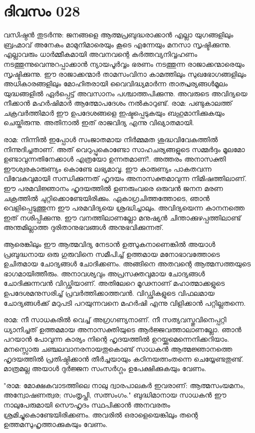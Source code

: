 \newpage
\section{ദിവസം 028}


വസിഷ്ഠന്‍ തുടര്‍ന്നു: ജനങ്ങളെ ആത്മപ്രബുദ്ധരാക്കാന്‍ എല്ലാ യുഗങ്ങളിലും ബ്രഹ്മാവ്‌ അനേകം മാമുനിമാരെയും കൂടെ എന്നേയും മനസാ സൃഷ്ടിക്കുന്നു. എല്ലാവരും ധാര്‍മ്മീകമായി അവനവന്റെ കര്‍ത്തവ്യനിവ്വഹണം നടത്തുന്നുവെന്നുറപ്പാക്കാന്‍ ന്യായപൂര്‍വ്വം ഭരണം നടത്തുന്ന രാജാക്കന്മാരെയും സൃഷ്ടിക്കുന്നു. ഈ രാജാക്കന്മാര്‍ താമസംവിനാ കാമത്തിലും സുഖഭോഗങ്ങളിലും അധികാരങ്ങളിലും മോഹിതരായി വൈവിദ്ധ്യമാര്‍ന്ന താത്പ്പര്യങ്ങള്‍മൂലം യുദ്ധങ്ങളില്‍ ഏര്‍പ്പെട്ട്‌ അവസാനം പശ്ചാത്തപിക്കുന്നു. അവരുടെ അവിദ്യയെ നീക്കാന്‍ മഹര്‍ഷിമാര്‍ ആത്മോപദേശം നല്‍കാറുണ്ട്‌. രാമ: പണ്ടുകാലത്ത്‌ ചക്രവര്‍ത്തിമാര്‍ ഈ ഉപദേശങ്ങളെ ഇഷ്ടപ്പെടുകയും ബഹുമാനിക്കുകയും ചെയ്തിരുന്നു. അതിനാല്‍ ഇത്‌ രാജവിദ്യ എന്നു വിഖ്യാതമായി.

രാമ: നിന്നില്‍ ഇപ്പോള്‍ സംജാതമായ നിര്‍മ്മമത ശുദ്ധവിവേകത്തില്‍ നിന്നുദിച്ചതാണ്‌. അത്‌ വെറുപ്പുകൊണ്ടോ സാഹചര്യങ്ങളുടെ സമ്മര്‍ദ്ദം മൂലമോ ഉണ്ടാവുന്നതിനേക്കാള്‍ എത്രയോ ഉന്നതമാണ്‌!. അത്തരം അനാസക്തി ഈശ്വരകാരുണ്യം കൊണ്ടേ ലഭ്യമാവൂ. ഈ കാരുണ്യം പാകതവന്ന വിവേകവുമായി സന്ധിക്കുന്നത്‌   ഹൃദയം അനാസക്തമാവുന്ന നിമിഷത്തിലാണ്‌. ഈ പരമവിജ്ഞാനം ഹൃദയത്തില്‍ ഉണരുംവരെ ഒരുവന്‍ ജനന മരണ ചക്രത്തില്‍ ചുറ്റിക്കൊണ്ടേയിരിക്കും. ഏകാഗ്രചിത്തത്തോടെ, ഞാന്‍ വെളിപ്പെടുത്തുന്ന ഈ പരമവിദ്യയെ  ശ്രദ്ധിച്ചാലും. അവിദ്യയെന്ന കാനനത്തെ ഇത്‌ നശിപ്പിക്കുന്നു. ഈ വനത്തിലാണല്ലോ മനുഷ്യന്‍ ചിന്താക്കുഴപ്പത്തിലാണ്ട്‌ അന്തമില്ലാത്ത ദുരിതാനുഭവങ്ങള്‍ അനുഭവിക്കുന്നത്‌. 

ആരെങ്കിലും ഈ ആത്മവിദ്യ നേടാന്‍ ഉത്സുകനാണെങ്കില്‍ അയാള്‍ പ്രബുദ്ധനായ ഒരു ഗുരുവിനെ സമീപിച്ച്‌ ഉത്തമായ മനോഭാവത്തോടെ ഉചിതമായ ചോദ്യങ്ങള്‍ ചോദിക്കണം. അങ്ങിനെ അതവന്റെ ആത്മസത്തയുടെ ഭാഗമായിത്തീരും. അനാവശ്യവും അപ്രസക്തവുമായ ചോദ്യങ്ങള്‍ ചോദിക്കുന്നവന്‍ വിഡ്ഢിയാണ്‌. അതിലേറെ മൂഢനാണ്‌ മഹാത്മാക്കളുടെ ഉപദേശമനുസരിച്ച്‌ പ്രവര്‍ത്തിക്കാത്തവന്‍. വിഡ്ഢികളുടെ വിഫലമായ ചോദ്യങ്ങള്‍ക്ക്‌ മറുപടി പറയുന്നവനെ മഹര്‍ഷി എന്നു വിളിക്കാന്‍ പറ്റില്ലതന്നെ.

രാമ: നീ സാധകരില്‍ വെച്ച്‌ അഗ്രഗണ്യനാണ്‌. നീ സത്യവസ്തുവിനെപ്പറ്റി ധ്യാനിച്ചത്‌ ഉത്തമമായ അനാസക്തിയുടെ ആര്‍ജ്ജവത്താലാണല്ലോ. ഞാന്‍ പറയാന്‍ പോവുന്ന കാര്യം നിന്റെ ഹൃദയത്തില്‍ ഉറയ്ക്കുമെന്നെനിക്കറിയാം. മനസ്സൊരു ചഞ്ചലവാനരനായതുകൊണ്ട്‌ സാധകന്‍ ആത്മജ്ഞാനത്തെ ഹൃദയത്തില്‍ പ്രതിഷ്ഠിക്കാന്‍ തീര്‍ച്ചയായും കഠിനയത്നംതന്നെ ചെയ്യേണ്ടതുണ്ട്‌. മാത്രമല്ല അയാള്‍ ദുര്‍ജ്ജന സംസര്‍ഗ്ഗം ഉപേക്ഷിക്കുകയും വേണം.

"രാമ: മോക്ഷകവാടത്തിലെ നാലു ദ്വാരപാലകര്‍ ഇവരാണ്‌: ആത്മസംയമനം, അന്വോഷണത്വര; സംതൃപ്തി,  സത്സംഗം." ബുദ്ധിമാനായ സാധകന്‍ ഈ നാലുപേരുമായി സൌഹൃദം സ്ഥപിക്കാന്‍ അനവരതം ശ്രമിച്ചുകൊണ്ടേയിരിക്കണം. അവരില്‍ ഒരാളെയെങ്കിലും തന്റെ ഉത്തമസുഹൃത്താക്കുകയും വേണം. 

